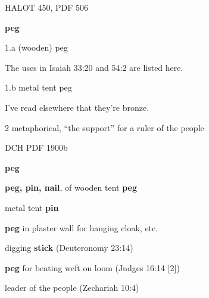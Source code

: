				\begin{compactdesc}
				
					\item[HALOT 450, PDF 506] \phantom{.}%
						\begin{compactitem}
							\item \textbf{peg}
							\item[1.a] (wooden) peg
								\begin{compactitem}
									\item The uses in Isaiah 33:20 and 54:2 are listed here.
								\end{compactitem}
							\item[1.b] metal tent peg
								\begin{compactitem}
									\item I've read elsewhere that they're bronze.
								\end{compactitem}
							\item[2] metaphorical, ``the support'' for a ruler of the people
						\end{compactitem}
						
					\item[DCH PDF 1900b] \phantom{.} %
						\begin{compactitem}
							\item \textbf{peg}
							\item \textbf{peg, pin, nail}, of wooden tent \textbf{peg}
							\item metal tent \textbf{pin}
							\item \textbf{peg} in plaster wall for hanging cloak, etc.
							\item digging \textbf{stick} (Deuteronomy 23:14)
							\item \textbf{peg} for beating weft on loom (Judges 16:14 [2])
							\item leader of the people (Zechariah 10:4)
						\end{compactitem}
						
						
						

\end{compactdesc}
